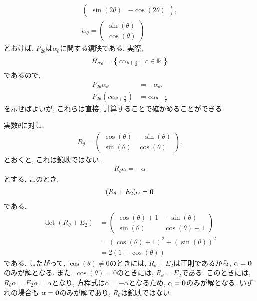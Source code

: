\begin{example}
\begin{align*}
\begin{pmatrix}
    \sin(2\theta) & -\cos(2\theta) 
  \end{pmatrix},\\
  \alpha_\theta
  =
  \begin{pmatrix}
    \sin(\theta) \\
    \cos(\theta) 
  \end{pmatrix}
\end{align*}
とおけば, $P_{2\theta}$は$\alpha_\theta$に関する鏡映である.
実際,
\begin{align*}
  H_{\alpha_{\theta}} = \Set{c \alpha_{\theta+\frac{\pi}{2}}|c\in \mathbb{R}} 
\end{align*}
であるので,
\begin{align*}
  P_{2\theta}\alpha_{\theta} &= - \alpha_{\theta},\\
  P_{2\theta}(c\alpha_{\theta+\frac{\pi}{2}}) &= c\alpha_{\theta+\frac{\pi}{2}}
\end{align*}
を示せばよいが, これらは直接, 計算することで確かめることができる.
\end{example}

\begin{example}
 実数$\theta$に対し,
  \begin{align*}
    R_\theta=
    \begin{pmatrix}
      \cos(\theta) & -\sin(\theta) \\
      \sin(\theta) & \cos(\theta)
    \end{pmatrix}.
  \end{align*}
 とおくと, これは鏡映ではない.
 \begin{align*}
    R_\theta \alpha = -\alpha
 \end{align*}
 とする. このとき,
 \begin{align*}
    (R_\theta + E_2)\alpha = \boldsymbol{0}
 \end{align*}
 である.
 \begin{align*}
   \det(R_\theta + E_2) &= 
    \begin{pmatrix}
      \cos(\theta) +1 & -\sin(\theta) \\
      \sin(\theta) & \cos(\theta) +1 
    \end{pmatrix}\\
    &=(\cos(\theta) +1)^2 + (\sin(\theta))^2\\
    &=2(1+\cos(\theta))
 \end{align*}
 である.
 したがって, $\cos(\theta)\neq 0$のときには,
 $R_\theta + E_2$は正則であるから, $\alpha=\boldsymbol{0}$のみが解となる.
 また,  $\cos(\theta)= 0$のときには, $R_\theta=E_2$である.
 このときには, $R_\theta \alpha = E_2\alpha = \alpha$となり, 方程式は$\alpha=-\alpha$となるため,
 $\alpha=\boldsymbol{0}$のみが解となる.
 いずれの場合も $\alpha=\boldsymbol{0}$のみが解であり,
$R_\theta$は鏡映ではない.
\end{example}

